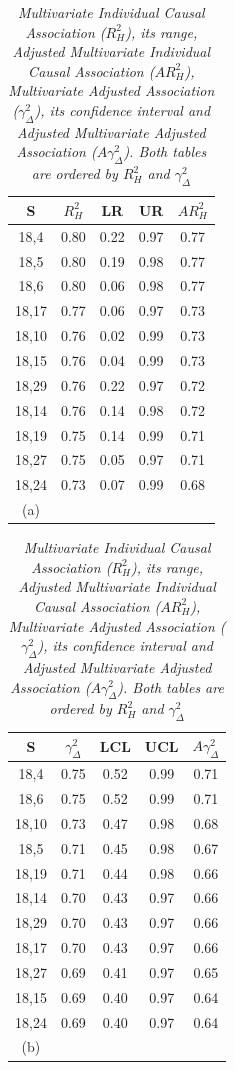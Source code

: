 \documentclass[a4paper,12pt]{article}
\begin{document}
	
	\begin{table}[H]
		\centering
		\begin{tabular}{ccccc}
			\hline
			S & $R^2_{H}$ & LR & UR & $AR^2_{H}$ \\ 
			\hline
			18,4 & 0.80 & 0.22 & 0.97 & 0.77 \\ 
			18,5 & 0.80 & 0.19 & 0.98 & 0.77 \\ 
			18,6 & 0.80 & 0.06 & 0.98 & 0.77 \\ 
			18,17 & 0.77 & 0.06 & 0.97 & 0.73 \\ 
			18,10 & 0.76 & 0.02 & 0.99 & 0.73 \\ 
			18,15 & 0.76 & 0.04 & 0.99 & 0.73 \\ 
			18,29 & 0.76 & 0.22 & 0.97 & 0.72 \\ 
			18,14 & 0.76 & 0.14 & 0.98 & 0.72 \\ 
			18,19 & 0.75 & 0.14 & 0.99 & 0.71 \\ 
			18,27 & 0.75 & 0.05 & 0.97 & 0.71 \\ 
			18,24 & 0.73 & 0.07 & 0.99 & 0.68 \\
			\hline
			(a)\\
		\end{tabular} 
		\quad
		\begin{tabular}{ccccc}
			\hline
			S & $\gamma^2_{\Delta}$ & LCL & UCL & $A\gamma^2_{\Delta}$ \\ 
			\hline
			18,4 & 0.75 & 0.52 & 0.99 & 0.71 \\ 
			18,6 & 0.75 & 0.52 & 0.99 & 0.71\\ 
			18,10 & 0.73 & 0.47 & 0.98 & 0.68\\ 
			18,5 & 0.71 & 0.45 & 0.98 & 0.67\\ 
			18,19 & 0.71 & 0.44 & 0.98 & 0.66\\ 
			18,14 & 0.70 & 0.43 & 0.97 & 0.66\\ 
			18,29 & 0.70 & 0.43 & 0.97 & 0.66\\ 
			18,17 & 0.70 & 0.43 & 0.97 & 0.66\\ 
			18,27 & 0.69 & 0.41 & 0.97 & 0.65\\ 
			18,15 & 0.69 & 0.40 & 0.97 & 0.64\\ 
			18,24 & 0.69 & 0.40 & 0.97 & 0.64\\  
			\hline
			(b)\\
		\end{tabular}
		\caption{\emph{Multivariate Individual Causal Association ($R^2_{H}$), its range, Adjusted Multivariate Individual Causal Association ($AR^2_{H}$), Multivariate Adjusted Association ($\gamma^2_{\Delta}$), its confidence interval and Adjusted Multivariate Adjusted Association ($A\gamma^2_{\Delta}$). Both tables are ordered by $R^2_{H}$ and $\gamma^2_{\Delta}$ }}\label{bivariate surrogates}
	\end{table}
	
\end{document}
